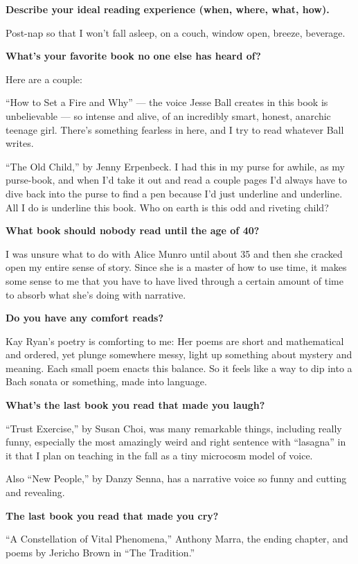 \textbf{Describe your ideal reading experience (when, where, what,
how).}

Post-nap so that I won't fall asleep, on a couch, window open, breeze,
beverage.

\textbf{What's your favorite book no one else has heard of?}

Here are a couple:

``How to Set a Fire and Why'' --- the voice Jesse Ball creates in this
book is unbelievable --- so intense and alive, of an incredibly smart,
honest, anarchic teenage girl. There's something fearless in here, and I
try to read whatever Ball writes.

``The Old Child,'' by Jenny Erpenbeck. I had this in my purse for
awhile, as my purse-book, and when I'd take it out and read a couple
pages I'd always have to dive back into the purse to find a pen because
I'd just underline and underline. All I do is underline this book. Who
on earth is this odd and riveting child?

\textbf{What book should nobody read until the age of 40?}

I was unsure what to do with Alice Munro until about 35 and then she
cracked open my entire sense of story. Since she is a master of how to
use time, it makes some sense to me that you have to have lived through
a certain amount of time to absorb what she's doing with narrative.

\textbf{Do you have any comfort reads?}

Kay Ryan's poetry is comforting to me: Her poems are short and
mathematical and ordered, yet plunge somewhere messy, light up something
about mystery and meaning. Each small poem enacts this balance. So it
feels like a way to dip into a Bach sonata or something, made into
language.

\textbf{What's the last book you read that made you laugh?}

``Trust Exercise,'' by Susan Choi, was many remarkable things, including
really funny, especially the most amazingly weird and right sentence
with ``lasagna'' in it that I plan on teaching in the fall as a tiny
microcosm model of voice.

Also ``New People,'' by Danzy Senna, has a narrative voice so funny and
cutting and revealing.

\textbf{The last book you read that made you cry?}

``A Constellation of Vital Phenomena,'' Anthony Marra, the ending
chapter, and poems by Jericho Brown in ``The Tradition.''

